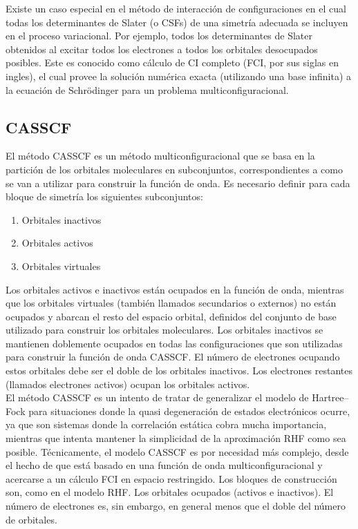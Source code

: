 \documentclass[12pt]{report}
\begin{document}
Existe un caso especial en el método de interacción de configuraciones en el cual todas los determinantes de Slater (o CSFs) de una simetría adecuada se incluyen en el proceso variacional. Por ejemplo, todos los determinantes de Slater obtenidos al excitar todos los electrones a todos los orbitales desocupados posibles. Este es conocido como cálculo de CI completo (FCI, por sus siglas en ingles), el cual provee la solución numérica exacta (utilizando una base infinita) a la ecuación de Schrödinger para un problema multiconfiguracional.



\subsection{CASSCF}
El método CASSCF es un método multiconfiguracional que se basa en la partición de los orbitales moleculares en subconjuntos, correspondientes a como se van a utilizar para construir la función de onda. Es necesario definir para cada bloque de simetría los siguientes subconjuntos:

\begin{enumerate}
\item Orbitales inactivos
\item Orbitales activos
\item Orbitales virtuales
\end{enumerate}


Los orbitales activos e inactivos están ocupados en la función de onda, mientras que los orbitales virtuales (también llamados secundarios o externos) no están ocupados y abarcan el resto del espacio orbital, definidos del conjunto de base utilizado para construir los orbitales moleculares. Los orbitales inactivos se mantienen doblemente ocupados en todas las configuraciones que son utilizadas para construir la función de onda CASSCF. El número de electrones ocupando estos orbitales debe ser el doble de los orbitales inactivos. Los electrones restantes (llamados electrones activos) ocupan los orbitales activos. 
\\



El método CASSCF es un intento de tratar de generalizar el modelo de Hartree–Fock para situaciones donde la quasi degeneración de estados electrónicos ocurre, ya que son sistemas donde la correlación estática cobra mucha importancia, mientras que intenta mantener la simplicidad de la aproximación RHF como sea posible. Técnicamente, el modelo CASSCF es por necesidad más complejo, desde el hecho de que está basado en una función de onda multiconfiguracional y acercarse a un cálculo FCI en espacio restringido. Los bloques de construcción son, como en el modelo RHF. Los orbitales ocupados (activos e inactivos). El número de electrones es, sin embargo, en general menos que el doble del número de orbitales.
\\
\end{document}
